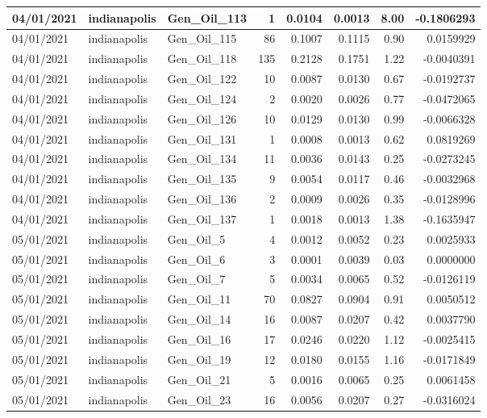 \documentclass[
  letterpaper,
  DIV=11,
  numbers=noendperiod]{scrartcl}
\begin{document}
\begin{tabular}{l|l|l|r|r|r|r|r}
\hline
04/01/2021 & indianapolis & Gen\_Oil\_113 & 1 & 0.0104 & 0.0013 & 8.00 & -0.1806293\\
\hline
04/01/2021 & indianapolis & Gen\_Oil\_115 & 86 & 0.1007 & 0.1115 & 0.90 & 0.0159929\\
\hline
04/01/2021 & indianapolis & Gen\_Oil\_118 & 135 & 0.2128 & 0.1751 & 1.22 & -0.0040391\\
\hline
04/01/2021 & indianapolis & Gen\_Oil\_122 & 10 & 0.0087 & 0.0130 & 0.67 & -0.0192737\\
\hline
04/01/2021 & indianapolis & Gen\_Oil\_124 & 2 & 0.0020 & 0.0026 & 0.77 & -0.0472065\\
\hline
04/01/2021 & indianapolis & Gen\_Oil\_126 & 10 & 0.0129 & 0.0130 & 0.99 & -0.0066328\\
\hline
04/01/2021 & indianapolis & Gen\_Oil\_131 & 1 & 0.0008 & 0.0013 & 0.62 & 0.0819269\\
\hline
04/01/2021 & indianapolis & Gen\_Oil\_134 & 11 & 0.0036 & 0.0143 & 0.25 & -0.0273245\\
\hline
04/01/2021 & indianapolis & Gen\_Oil\_135 & 9 & 0.0054 & 0.0117 & 0.46 & -0.0032968\\
\hline
04/01/2021 & indianapolis & Gen\_Oil\_136 & 2 & 0.0009 & 0.0026 & 0.35 & -0.0128996\\
\hline
04/01/2021 & indianapolis & Gen\_Oil\_137 & 1 & 0.0018 & 0.0013 & 1.38 & -0.1635947\\
\hline
05/01/2021 & indianapolis & Gen\_Oil\_5 & 4 & 0.0012 & 0.0052 & 0.23 & 0.0025933\\
\hline
05/01/2021 & indianapolis & Gen\_Oil\_6 & 3 & 0.0001 & 0.0039 & 0.03 & 0.0000000\\
\hline
05/01/2021 & indianapolis & Gen\_Oil\_7 & 5 & 0.0034 & 0.0065 & 0.52 & -0.0126119\\
\hline
05/01/2021 & indianapolis & Gen\_Oil\_11 & 70 & 0.0827 & 0.0904 & 0.91 & 0.0050512\\
\hline
05/01/2021 & indianapolis & Gen\_Oil\_14 & 16 & 0.0087 & 0.0207 & 0.42 & 0.0037790\\
\hline
05/01/2021 & indianapolis & Gen\_Oil\_16 & 17 & 0.0246 & 0.0220 & 1.12 & -0.0025415\\
\hline
05/01/2021 & indianapolis & Gen\_Oil\_19 & 12 & 0.0180 & 0.0155 & 1.16 & -0.0171849\\
\hline
05/01/2021 & indianapolis & Gen\_Oil\_21 & 5 & 0.0016 & 0.0065 & 0.25 & 0.0061458\\
\hline
05/01/2021 & indianapolis & Gen\_Oil\_23 & 16 & 0.0056 & 0.0207 & 0.27 & -0.0316024\\

\end{tabular}
\end{document}
